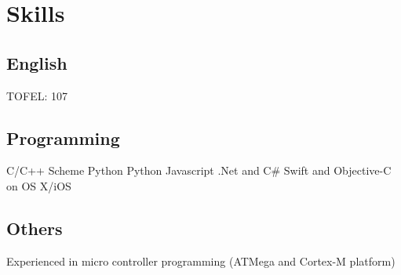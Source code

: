 \documentclass[]{deedy-resume-openfont}
\begin{document}
\begin{minipage}[t]{0.35\textwidth}




\section{Skills}
\subsection{English}
TOFEL: 107
\subsection{Programming}
C/C++ \textbullet{} Scheme \textbullet{} Python \textbullet{} Python \textbullet{} Javascript  \textbullet{} .Net and C\# \textbullet{} Swift and Objective-C on OS X/iOS
\subsection{Others}
Experienced in micro controller programming (ATMega and Cortex-M platform)
\sectionsep



\end{minipage}
\end{document}
